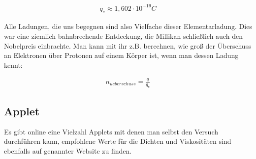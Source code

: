 \begin{align}
	q_e \approx 1,602 \cdot 10^{-19} C
\end{align}

Alle Ladungen, die uns begegnen sind also Vielfache dieser Elementarladung. Dies war eine ziemlich bahnbrechende Entdeckung, die Millikan schließlich auch den Nobelpreis einbrachte. Man kann mit ihr z.B. berechnen, wie groß der Überschuss an Elektronen über Protonen auf einem Körper ist, wenn man dessen Ladung kennt:

\begin{align}
	n_{ueberschuss} = \frac{q}{q_e}
\end{align}


\subsection{Applet}

Es gibt online eine Vielzahl Applets mit denen man selbst den Versuch durchführen kann, empfohlene Werte für die Dichten und Viskositäten sind ebenfalls auf genannter Website zu finden.




